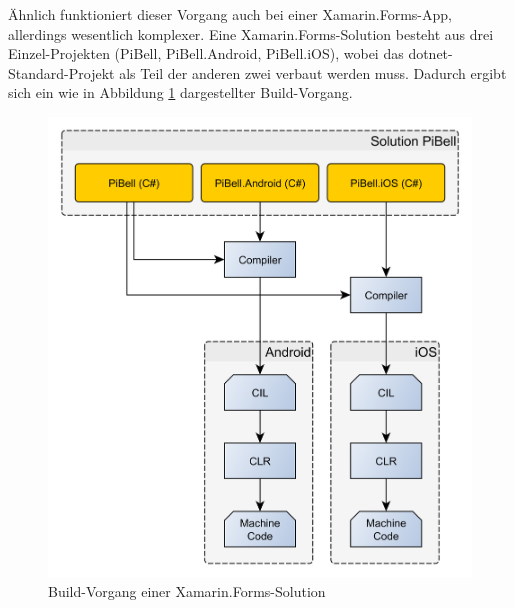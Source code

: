 Ähnlich funktioniert dieser Vorgang auch bei einer Xamarin.Forms-App, allerdings wesentlich komplexer.
Eine Xamarin.Forms-Solution besteht aus drei Einzel-Projekten (PiBell, PiBell.Android, PiBell.iOS), wobei das \ac{dotnet}-Standard-Projekt als Teil der anderen zwei verbaut werden muss.
Dadurch ergibt sich ein wie in Abbildung \ref{fig:build-forms} dargestellter Build-Vorgang.
\begin{figure}[htbp!]
    \centering\includegraphics[width=0.9\linewidth]{images/auswahl_rahmenwerk/build-vorgang.png}
    \caption{Build-Vorgang einer Xamarin.Forms-Solution}
    \label{fig:build-forms}
\end{figure}

